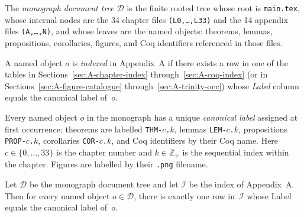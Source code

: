 \begin{definition}
\label{def:doc-tree}
The \emph{monograph document tree} $\mathcal{D}$ is the finite rooted
tree whose root is \texttt{main.tex}, whose internal nodes are the 34
chapter files \texttt{(L0,\ldots,L33)} and the 14 appendix files
\texttt{(A,\ldots,N)}, and whose leaves are the named objects:
theorems, lemmas, propositions, corollaries, figures, and Coq
identifiers referenced in those files.

A named object $o$ is \emph{indexed} in Appendix~A if there exists a
row in one of the tables in Sections~\ref{sec:A-chapter-index}
through~\ref{sec:A-coq-index} (or in Sections~\ref{sec:A-figure-catalogue}
through~\ref{sec:A-trinity-occ}) whose \emph{Label} column equals the
canonical label of~$o$.
\end{definition}

\begin{definition}
\label{def:canonical-label}
Every named object $o$ in the monograph has a unique \emph{canonical
label} assigned at first occurrence: theorems are labelled
\texttt{THM-}$c$\texttt{.}$k$, lemmas \texttt{LEM-}$c$\texttt{.}$k$,
propositions \texttt{PROP-}$c$\texttt{.}$k$, corollaries
\texttt{COR-}$c$\texttt{.}$k$, and Coq identifiers by their Coq name.
Here $c\in\{0,\ldots,33\}$ is the chapter number and
$k\in\mathbb{Z}_{+}$ is the sequential index within the chapter.
Figures are labelled by their \texttt{.png} filename.
\end{definition}

\begin{theorem}
\label{thm:catalogue-completeness}
Let $\mathcal{D}$ be the monograph document tree and let $\mathcal{I}$
be the index of Appendix~A.
Then for every named object $o\in\mathcal{D}$, there is exactly one
row in~$\mathcal{I}$ whose Label equals the canonical label of~$o$.
\end{theorem}

